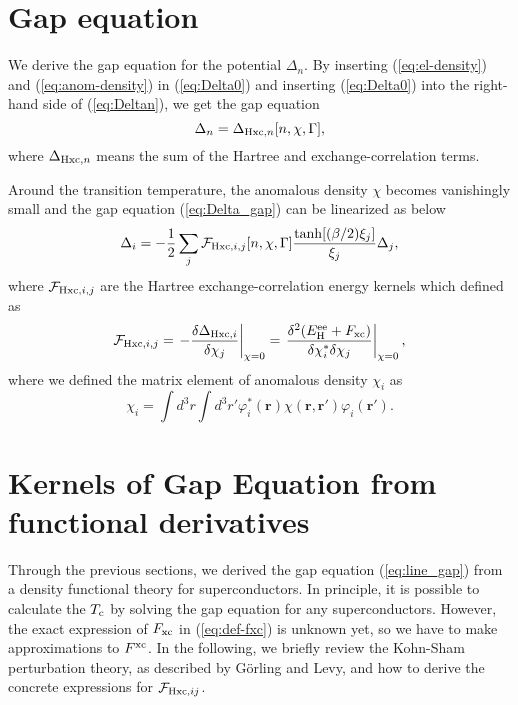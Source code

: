 \section{Gap equation}
%
We derive the gap equation for the potential $\Delta_n$. By inserting (\ref{eq:el-density}) 
and (\ref{eq:anom-density}) in (\ref{eq:Delta0}) and inserting (\ref{eq:Delta0}) into the 
right-hand side of (\ref{eq:Deltan}), we get the gap equation
%
\begin{equation}
	\Delta_n = \Delta_{{\rm Hxc}, n}[n, \chi, \Gamma],
	\label{eq:Delta_gap}
\end{equation}
%
where $\Delta_{{\rm Hxc},n}$ means the sum of the Hartree and exchange-correlation terms.

Around the transition temperature, the anomalous density $\chi$ becomes vanishingly small 
and the gap equation (\ref{eq:Delta_gap}) can be linearized as below
%
\begin{equation}
	\Delta_i = -\frac{1}{2}\sum_{j} {\mathcal F}_{{\rm Hxc}, i,j}[n, \chi, \Gamma]
	\frac{\tanh[(\beta/2)\xi_j]}{\xi_j}\Delta_j,
	\label{eq:line_gap}
\end{equation}
%
where ${\mathcal F}_{{\rm Hxc}, i,j}$ are the Hartree exchange-correlation energy kernels which defined as
%
\begin{equation}
	{\mathcal F}_{{\rm Hxc},i,j} = \left. -\frac{\delta \Delta_{{\rm Hxc}, i}}{\delta \chi_j} 
	                               \right|_{\chi = 0}
				       = \left. \frac{\delta^2(E^{\rm ee}_{\rm H}+F_{\rm xc})}
				       {\delta \chi^{\ast}_i \delta \chi_j} \right|_{\chi = 0},
	\label{eq:def-fxc}
\end{equation}
%
where we defined the matrix element of anomalous density $\chi_i$ as
%
\begin{equation}
	\chi_i = \int d^3r\int d^3r' \varphi^{\ast}_i(\bm{r})\chi(\bm{r}, \bm{r'})\varphi_i(\bm{r'}).
	\label{eq:chi_i_def}
\end{equation}
%

\section{Kernels of Gap Equation from functional derivatives}

Through the previous sections, we derived the gap equation (\ref{eq:line_gap}) from a density functional
theory for superconductors. In principle, it is possible to calculate the $T_{\rm c}$ by solving 
the gap equation for any superconductors. However, the exact expression of $F_{\rm xc}$ in (\ref{eq:def-fxc})
is unknown yet, so we have to make approximations to $F^{\rm xc}$.
In the following, we briefly review the Kohn-Sham perturbation theory,
as described by G\"{o}rling and Levy\cite{Levy1994}, 
and how to derive the concrete expressions for ${\mathcal F}_{{\rm Hxc},ij}$.

